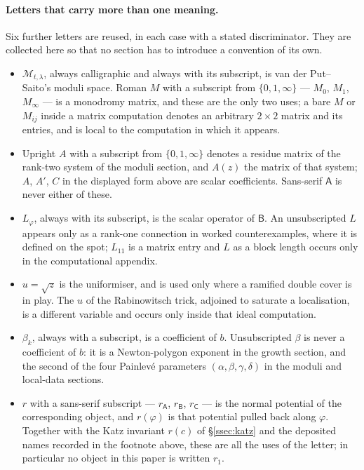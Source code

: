 \paragraph{Letters that carry more than one meaning.}
Six further letters are reused, in each case with a stated discriminator. They
are collected here so that no section has to introduce a convention of its own.
\begin{itemize}
  \item $\mathcal M_{t,\lambda}$, always calligraphic and always with its
    subscript, is van der Put--Saito's moduli space. Roman $M$ with a
    subscript from $\{0,1,\infty\}$ --- $M_0$, $M_1$, $M_\infty$ --- is a
    monodromy matrix, and these are the only two uses; a bare $M$ or $M_{ij}$
    inside a matrix computation denotes an arbitrary $2\times2$ matrix and its
    entries, and is local to the computation in which it appears.
  \item Upright $A$ with a subscript from $\{0,1,\infty\}$ denotes a residue
    matrix of the rank-two system of the moduli section, and $A(z)$ the matrix
    of that system; $A$, $A'$, $C$ in the displayed form above are scalar
    coefficients. Sans-serif $\mathsf A$ is never either of these.
  \item $L_\varphi$, always with its subscript, is the scalar operator of
    $\mathsf B$. An unsubscripted $L$ appears only as a rank-one connection in
    worked counterexamples, where it is defined on the spot; $L_{11}$ is a
    matrix entry and $L$ as a block length occurs only in the computational
    appendix.
  \item $u=\sqrt z$ is the uniformiser, and is used only where a ramified
    double cover is in play. The $u$ of the Rabinowitsch trick, adjoined to
    saturate a localisation, is a different variable and occurs only inside
    that ideal computation.
  \item $\beta_k$, always with a subscript, is a coefficient of $b$.
    Unsubscripted $\beta$ is never a coefficient of $b$: it is a Newton-polygon
    exponent in the growth section, and the second of the four Painlev\'e
    parameters $(\alpha,\beta,\gamma,\delta)$ in the moduli and local-data
    sections.
  \item $r$ with a sans-serif subscript --- $r_{\mathsf A}$, $r_{\mathsf B}$,
    $r_{\mathsf C}$ --- is the normal potential of the corresponding object,
    and $r(\varphi)$ is that potential pulled back along $\varphi$. Together
    with the Katz invariant $r(c)$ of \S\ref{ssec:katz} and the deposited
    names recorded in the footnote above, these are all the uses of the
    letter; in particular no object in this paper is written $r_1$.
\end{itemize}

